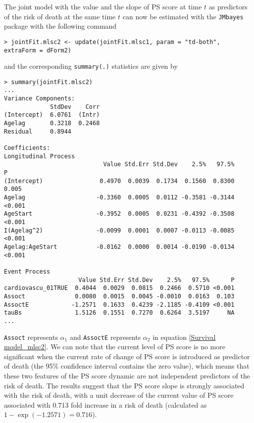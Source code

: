 \documentclass[12pt]{article}
\begin{document}
The joint model with the value and the slope of PS score at time $t$ as predictors of the risk of death at the same time $t$ can now be estimated with the \texttt{JMbayes} package with the following command
\begin{verbatim}
> jointFit.mlsc2 <- update(jointFit.mlsc1, param = "td-both", extraForm = dForm2)
\end{verbatim}
and the corresponding \texttt{summary(.)} statistics are given by
\begin{verbatim}
> summary(jointFit.mlsc2)
...
Variance Components:
             StdDev    Corr
(Intercept)  6.0761  (Intr)
Agelag       0.3218  0.2468
Residual     0.8944

Coefficients:
Longitudinal Process
                            Value Std.Err Std.Dev    2.5%   97.5%      P
(Intercept)                0.4970  0.0039  0.1734  0.1560  0.8300  0.005
Agelag                    -0.3360  0.0005  0.0112 -0.3581 -0.3144 <0.001
AgeStart                  -0.3952  0.0005  0.0231 -0.4392 -0.3508 <0.001
I(Agelag^2)               -0.0099  0.0001  0.0007 -0.0113 -0.0085 <0.001
Agelag:AgeStart           -0.0162  0.0000  0.0014 -0.0190 -0.0134 <0.001

Event Process
                     Value Std.Err Std.Dev    2.5%   97.5%      P
cardiovascu_01TRUE  0.4044  0.0029  0.0815  0.2466  0.5710 <0.001
Assoct              0.0080  0.0015  0.0045 -0.0010  0.0163  0.103
AssoctE            -1.2571  0.1633  0.4239 -2.1185 -0.4109 <0.001
tauBs               1.5126  0.1551  0.7270  0.6264  3.5197     NA
...
\end{verbatim}
\texttt{Assoct} represents $\alpha_1$ and \texttt{AssoctE} represents $\alpha_2$ in equation \eqref{Survival model_mlsc2}. We can note that the current level of PS score is no more significant when the current rate of change of PS score is introduced as predictor of death (the 95\% confidence interval contains the zero value), which means that these two features of the PS score dynamic are not independent predictors of the risk of death. The results suggest that the PS score slope is strongly associated with the risk of death, with a unit decrease of the current value of PS score associated with $0.713$ fold increase in a risk of death (calculated as $1-\exp (-1.2571)=0.716$).
\end{document}

